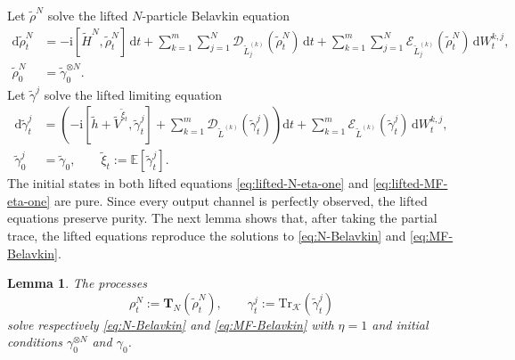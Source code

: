 \documentclass[10pt,a4paper,reqno]{amsart}
\numberwithin{equation}{section}
\theoremstyle{plain}
\newtheorem{lemma}[theorem]{Lemma}
\theoremstyle{definition}
\theoremstyle{remark}
\renewcommand{\d}{\mathrm d}
\renewcommand{\i}{\mathrm i}
\newcommand{\Tr}{\mathrm{Tr}}
\newcommand{\E}{\mathbb E}
\newcommand{\cD}{\mathcal D}
\newcommand{\cE}{\mathcal E}
\newcommand{\KK}{\mathcal K}
\newcommand{\1}{\mathbf 1}
\begin{document}
Let $\widetilde\rho^N$ solve the lifted $N$-particle Belavkin equation
\begin{equation}
\begin{aligned}
  \d\widetilde\rho_t^N
  &=
  -\i[
    \widetilde H^N,\widetilde\rho_t^N
  ]\,\d t
  +
  \sum_{k=1}^m\sum_{j=1}^N
  \cD_{\widetilde L_j^{(k)}}
  (\widetilde\rho_t^N)\,\d t
  +
  \sum_{k=1}^m\sum_{j=1}^N
  \cE_{\widetilde L_j^{(k)}}
  (\widetilde\rho_t^N)\,\d W_t^{k,j},
  \\
  \widetilde\rho_0^N
  &=
  \widetilde\gamma_0^{\otimes N}.
\end{aligned}
  \label{eq:lifted-N-eta-one}
\end{equation}
Let $\widetilde\gamma^j$ solve the lifted limiting equation
\begin{equation}
\begin{aligned}
  \d\widetilde\gamma_t^j
  &=
  \left(
    -\i[
      \widetilde h
      +
      \widetilde V^{\widetilde\xi_t},
      \widetilde\gamma_t^j
    ]
    +
    \sum_{k=1}^m
    \cD_{\widetilde L^{(k)}}
    (\widetilde\gamma_t^j)
  \right)\d t
  +
  \sum_{k=1}^m
  \cE_{\widetilde L^{(k)}}
  (\widetilde\gamma_t^j)\,\d W_t^{k,j},
  \\
  \widetilde\gamma_0^j
  &=
  \widetilde\gamma_0,
  \qquad
  \widetilde\xi_t
  :=
  \E[\widetilde\gamma_t^j].
\end{aligned}
  \label{eq:lifted-MF-eta-one}
\end{equation}
The initial states in both lifted equations \eqref{eq:lifted-N-eta-one} and \eqref{eq:lifted-MF-eta-one} are pure.  Since every output
channel is perfectly observed, the lifted equations preserve purity.  The next lemma shows that, after taking the partial trace, the lifted equations  reproduce the solutions to  \eqref{eq:N-Belavkin} and
\eqref{eq:MF-Belavkin}.   

\begin{lemma}
\label{lem:trace-down-dynamics}
The processes
\begin{equation}
  \rho_t^N
  :=
  \mathbf T_N(\widetilde\rho_t^N),
  \qquad
  \gamma_t^j
  :=
  \Tr_{\KK}(\widetilde\gamma_t^j)
  \label{eq:trace-down-processes}
\end{equation}
solve respectively \eqref{eq:N-Belavkin} and
\eqref{eq:MF-Belavkin} with $\eta=1$ and initial conditions
$\gamma_0^{\otimes N}$ and $\gamma_0$.
\end{lemma}
\end{document}
